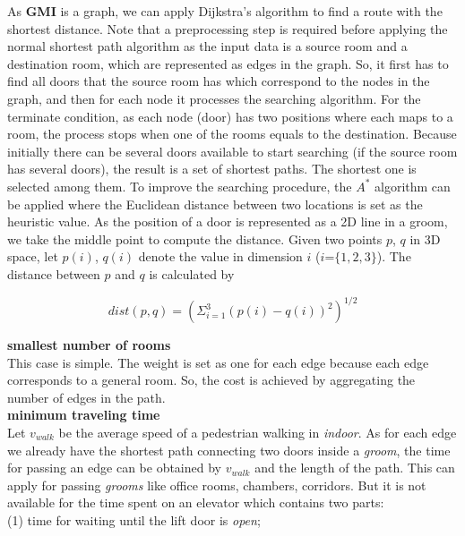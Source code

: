 As \textbf{GMI} is a graph, we can apply Dijkstra's algorithm to find a route with the 
shortest distance. Note that a preprocessing step is required before applying the normal shortest path algorithm as the input data is a source room and a destination room, which are represented as edges
in the graph. So, it first has to find all doors that the source room has 
which correspond to the nodes in the graph, and then for each node it processes the searching algorithm. For the terminate condition, as each node (door) has two positions where each maps to a room, the process stops when one of the rooms equals to the destination. Because initially there can be several doors available to start searching (if the source room has several doors), 
the result is a set of shortest paths.  
The shortest one is selected among them. To improve the searching procedure, 
the $A^*$ algorithm can be applied where the Euclidean distance between two locations is set 
as the heuristic value. As the position of a door is represented as a 2D line in a groom, 
we take the middle point to compute the distance. Given two points $p$, $q$ in 3D space,
let $p(i)$, $q(i)$ denote the value in dimension $i$ ($i$=$\{1,2,3\}$). 
The distance between $p$ and $q$ is calculated by 

\begin{equation}
\label{bs}
dist(p,q)= (\Sigma_{i=1}^3(p(i)-q(i))^2)^{1/2}
\end{equation}

\textbf{smallest number of rooms} \\

This case is simple. The weight is set as one for each edge because each edge corresponds to a general room. So, the cost is achieved by aggregating the number of edges in the path. \\

\textbf{minimum traveling time} \\

Let $v_{walk}$ be the average speed of a pedestrian walking in \textit{indoor}. As for each edge we already have the shortest path connecting two doors inside a \textit{groom}, the time for passing an edge can be obtained by $v_{walk}$ and the length of the path. This can apply for passing \textit{grooms} like office rooms, chambers, corridors. But it is not available for the time spent on an elevator which contains two parts: \\

(1) time for waiting until the lift door is \textit{open}; 

